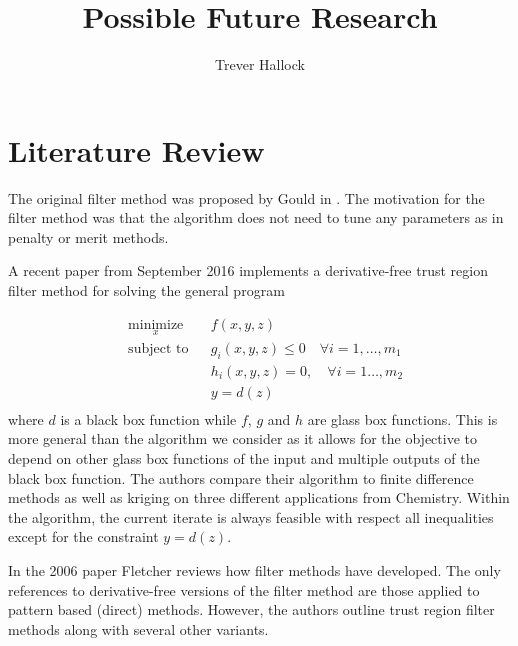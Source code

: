 \documentclass{article} %
\title{Possible Future Research}
\author{Trever Hallock}
\begin{document}
%
\algnewcommand{\Goto}{\algorithmicgoto\xspace}%
\algnewcommand{\Label}{\State\unskip}

\maketitle

\section{Literature Review}

The original filter method was proposed by Gould in \cite{DUMMY:original_filter}. The motivation for the filter method was that the algorithm does not need to tune any parameters as in penalty or merit methods.

A recent paper from September 2016 \cite{DUMMY:Biegler} implements a derivative-free trust region filter method for solving the general program 

\begin{equation*}
\begin{aligned}
& \underset{x}{\text{minimize}} & & f(x, y, z) \\
& \text{subject to} & & g_i(x, y, z) \leq 0 \quad \forall i = 1, \ldots, m_1 \\
& & & h_i(x, y, z) = 0, \quad \forall i = 1 \ldots, m_2 \\
& & & y = d(z) \;  \\
\end{aligned}
\end{equation*}
where $d$ is a black box function while $f$, $g$ and $h$ are glass box functions.
This is more general than the algorithm we consider as it allows for the objective to depend on other glass box functions of the input and multiple outputs of the black box function. The authors compare their algorithm to finite difference methods as well as kriging on three different applications from Chemistry. Within the algorithm, the current iterate is always feasible with respect all inequalities except for the constraint $y=d(z)$. 





In the 2006 paper \cite{DUMMY:Fletcher} Fletcher reviews how filter methods have developed. The only references to derivative-free versions of the filter method are those applied to pattern based (direct) methods. However, the authors outline trust region filter methods along with several other variants.
\end{document}
